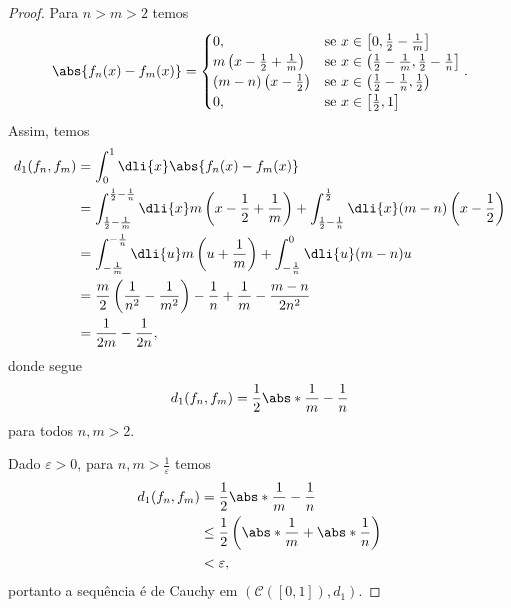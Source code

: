 \begin{proof}
    Para \(n > m > 2\) temos
    \begin{equation*}
        \abs{f_n(x) - f_m(x)} = \begin{cases}
            0, &\text{se }x \in \left[0, \frac12-\frac1m\right]\\
            m\left(x - \frac12+ \frac1m\right)&\text{se }x \in \left(\frac12 - \frac1m, \frac12-\frac1n\right]\\
            (m-n)\left(x - \frac12\right)&\text{se }x \in \left(\frac12 - \frac1n, \frac12\right)\\
            0, &\text{se }x \in \left[\frac12, 1\right]\\
        \end{cases}.
    \end{equation*}
    Assim, temos
    \begin{align*}
        d_1(f_n, f_m) &= \int_0^1\dli{x} \abs{f_n(x) - f_m(x)} \\
                      &= \int_{\frac12-\frac1m}^{\frac12 - \frac1n}\dli{x} m\left(x - \frac12 + \frac1m\right) + \int_{\frac12-\frac1n}^{\frac12} \dli{x} (m-n)\left(x - \frac12\right)\\
                      &= \int_{-\frac1m}^{-\frac1n}\dli{u} m\left(u + \frac1m\right) + \int_{-\frac1n}^{0} \dli{u} (m-n)u\\
                      &= \frac{m}{2}\left(\frac{1}{n^2} - \frac{1}{m^2}\right) - \frac1n + \frac1m - \frac{m-n}{2n^2}\\
                      &= \frac{1}{2m}-\frac{1}{2n},
    \end{align*}
    donde segue
    \begin{equation*}
        d_1(f_n, f_m) = \frac12\abs*{\frac1m - \frac1n}
    \end{equation*}
    para todos \(n,m > 2\).

    Dado \(\varepsilon > 0\), para \(n,m > \frac{1}{\varepsilon}\) temos
    \begin{align*}
        d_1(f_n, f_m) &= \frac12\abs*{\frac1m - \frac1n}\\
                      &\leq \frac12\left(\abs*{\frac1{m}} + \abs*{\frac{1}{n}}\right)\\
                      &< \varepsilon,
    \end{align*}
    portanto a sequência é de Cauchy em \((\mathcal{C}([0,1]), d_1)\).
\end{proof}

